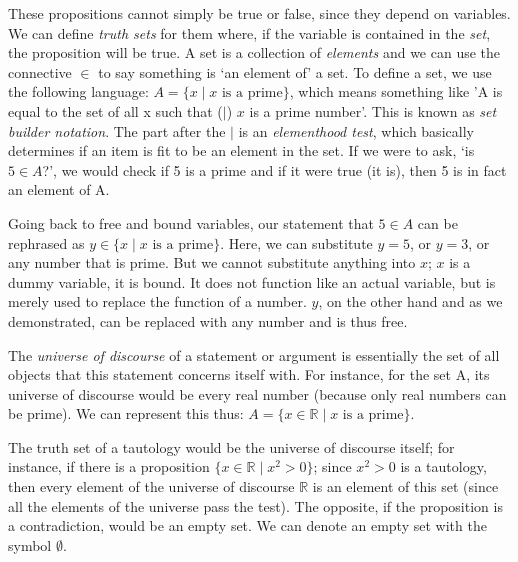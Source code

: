 \documentclass[a4paper, 11pt]{article}
\begin{document}
These propositions cannot simply be true or false, since they depend on variables. We can define \textit{truth sets} for them where, if the variable is contained in the \textit{set}, the proposition will be true. A set is a collection of \textit{elements} and we can use the connective $\in$ to say something is `an element of' a set. To define a set, we use the following language: $A = \{x \mid x \text{ is a prime}\}$, which means something like 'A is equal to the set of all x such that ($\mid$) $x$ is a prime number'. This is known as \textit{set builder notation}. The part after the $\mid$ is an \textit{elementhood test}, which basically determines if an item is fit to be an element in the set. If we were to ask, `is $5 \in A$?', we would check if 5 is a prime and if it were true (it is), then 5 is in fact an element of A.

Going back to free and bound variables, our statement that $5 \in A$ can be rephrased as $y \in \{x \mid x \text{ is a prime} \}$. Here, we can substitute $y = 5$, or $y = 3$, or any number that is prime. But we cannot substitute anything into $x$; $x$ is a dummy variable, it is bound. It does not function like an actual variable, but is merely used to replace the function of a number. $y$, on the other hand and as we demonstrated, can be replaced with any number and is thus free.

The \textit{universe of discourse} of a statement or argument is essentially the set of all objects that this statement concerns itself with. For instance, for the set A, its universe of discourse would be every real number (because only real numbers can be prime). We can represent this thus: $A = \{x \in \mathbb{R} \mid x \text{ is a prime}\}$.

The truth set of a tautology would be the universe of discourse itself; for instance, if there is a proposition $\{x \in \mathbb{R} \mid x^2 > 0\}$; since $x^2 > 0$ is a tautology, then every element of the universe of discourse $\mathbb{R}$ is an element of this set (since all the elements of the universe pass the test). The opposite, if the proposition is a contradiction, would be an empty set. We can denote an empty set with the symbol $\emptyset$.


\clearpage
\end{document}
